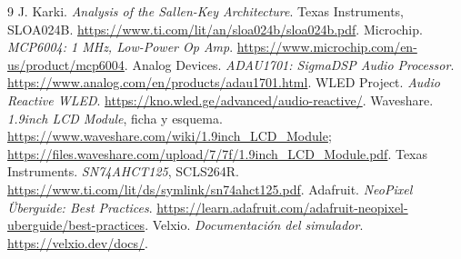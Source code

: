 \documentclass[11pt,a4paper]{article}
\begin{document}
\newpage
\begin{thebibliography}{9}
 J. Karki. \emph{Analysis of the Sallen-Key Architecture}. Texas Instruments, SLOA024B. \url{https://www.ti.com/lit/an/sloa024b/sloa024b.pdf}.
 Microchip. \emph{MCP6004: 1 MHz, Low-Power Op Amp}. \url{https://www.microchip.com/en-us/product/mcp6004}.
 Analog Devices. \emph{ADAU1701: SigmaDSP Audio Processor}. \url{https://www.analog.com/en/products/adau1701.html}.
 WLED Project. \emph{Audio Reactive WLED}. \url{https://kno.wled.ge/advanced/audio-reactive/}.
 Waveshare. \emph{1.9inch LCD Module}, ficha y esquema. \url{https://www.waveshare.com/wiki/1.9inch_LCD_Module}; \url{https://files.waveshare.com/upload/7/7f/1.9inch_LCD_Module.pdf}.
 Texas Instruments. \emph{SN74AHCT125}, SCLS264R. \url{https://www.ti.com/lit/ds/symlink/sn74ahct125.pdf}.
 Adafruit. \emph{NeoPixel Überguide: Best Practices}. \url{https://learn.adafruit.com/adafruit-neopixel-uberguide/best-practices}.
 Velxio. \emph{Documentación del simulador}. \url{https://velxio.dev/docs/}.
\end{thebibliography}
\end{document}
